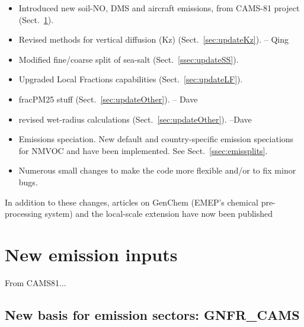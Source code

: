 
\begin{itemize}

\item Introduced new soil-NO, DMS and aircraft emissions, from CAMS-81 project
(Sect.~\ref{sec:updateEmis}). 

\item Revised methods for vertical diffusion (Kz)  (Sect.~\ref{sec:updateKz}). -- Qing

\item Modified fine/coarse split of sea-salt (Sect.~\ref{ssec:updateSS}).

\item
Upgraded Local Fractions capabilities (Sect.~\ref{sec:updateLF}).

\item  fracPM25 stuff (Sect.~\ref{sec:updateOther}). -- Dave
\item revised wet-radius calculations (Sect.~\ref{sec:updateOther}). --Dave


\item
Emissions speciation. New default and country-specific emission
speciations for NMVOC and \pmfine have been implemented.  See
Sect.~\ref{ssec:emissplits}.

\item
Numerous small changes to make the code more flexible and/or to
fix minor bugs.

\end{itemize}

In addition to these changes, articles on GenChem (EMEP's chemical pre-processing system)  and
the local-scale extension  have now been published \citep{Simpson:GenChem,Denby:2020}

\section{New emission inputs}
\label{sec:updateEmis}

From CAMS81...

\subsection{New basis for emission sectors: GNFR\_CAMS}
\label{ssec:gnfr}

